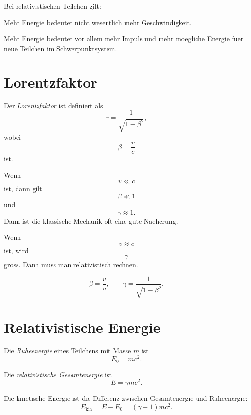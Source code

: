 \begin{examtipbox}
Bei relativistischen Teilchen gilt:

Mehr Energie bedeutet nicht wesentlich mehr Geschwindigkeit.

Mehr Energie bedeutet vor allem mehr Impuls und mehr moegliche Energie fuer neue
Teilchen im Schwerpunktsystem.
\end{examtipbox}

\section{Lorentzfaktor}

\begin{definitionbox}
Der \emph{Lorentzfaktor} ist definiert als
\[
    \gamma
    =
    \frac{1}{\sqrt{1-\beta^2}},
\]
wobei
\[
    \beta=\frac{v}{c}
\]
ist.
\end{definitionbox}

\begin{conceptbox}
Wenn
\[
    v \ll c
\]
ist, dann gilt
\[
    \beta \ll 1
\]
und
\[
    \gamma \approx 1.
\]
Dann ist die klassische Mechanik oft eine gute Naeherung.

Wenn
\[
    v \approx c
\]
ist, wird
\[
    \gamma
\]
gross.
Dann muss man relativistisch rechnen.
\end{conceptbox}

\begin{formulabox}
\[
    \beta=\frac{v}{c},
    \qquad
    \gamma=\frac{1}{\sqrt{1-\beta^2}}.
\]
\end{formulabox}

\section{Relativistische Energie}

\begin{definitionbox}
Die \emph{Ruheenergie} eines Teilchens mit Masse $m$ ist
\[
    E_0=mc^2.
\]
\end{definitionbox}

\begin{definitionbox}
Die \emph{relativistische Gesamtenergie} ist
\[
    E=\gamma mc^2.
\]
\end{definitionbox}

\begin{formulabox}
Die kinetische Energie ist die Differenz zwischen Gesamtenergie und Ruheenergie:
\[
    E_{\mathrm{kin}}
    =
    E-E_0
    =
    (\gamma-1)mc^2.
\]
\end{formulabox}

